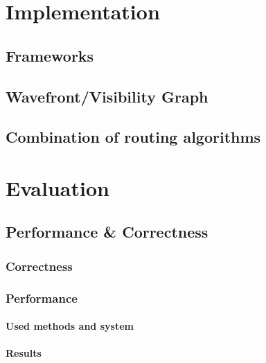 \documentclass[
	11pt,
	a4paper,
	usegeometry,
	twoside,
	openright,
	toc=chapterentrywithdots
]{scrbook}
\begin{document}
	
	\chapter{Implementation}
	
		\section{Frameworks}
		
	
		\section{Wavefront/Visibility Graph}
		
		
		\section{Combination of routing algorithms}
	
	\chapter{Evaluation}
	
		\section{Performance \& Correctness}
		
			\subsection{Correctness}
			
			\subsection{Performance}
			
			\subsubsection{Used methods and system}
			
			
			\subsubsection{Results}
		
\end{document}
